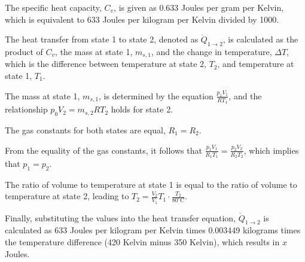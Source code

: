 The specific heat capacity, \( C_v \), is given as 0.633 Joules per gram per Kelvin, which is equivalent to 633 Joules per kilogram per Kelvin divided by 1000.

The heat transfer from state 1 to state 2, denoted as \( \dot{Q}_{1 \rightarrow 2} \), is calculated as the product of \( C_v \), the mass at state 1, \( m_{s,1} \), and the change in temperature, \( \Delta T \), which is the difference between temperature at state 2, \( T_2 \), and temperature at state 1, \( T_1 \).

The mass at state 1, \( m_{s,1} \), is determined by the equation \( \frac{p_1 V_1}{R T_1} \), and the relationship \( p_0 V_2 = m_{s,2} R T_2 \) holds for state 2.

The gas constants for both states are equal, \( R_1 = R_2 \).

From the equality of the gas constants, it follows that \( \frac{p_1 V_1}{R_1 T_1} = \frac{p_2 V_2}{R_2 T_2} \), which implies that \( p_1 = p_2 \).

The ratio of volume to temperature at state 1 is equal to the ratio of volume to temperature at state 2, leading to \( T_2 = \frac{V_2}{V_1} T_1 \cdot \frac{T_2}{80^\circ \text{C}} \).

Finally, substituting the values into the heat transfer equation, \( \dot{Q}_{1 \rightarrow 2} \) is calculated as 633 Joules per kilogram per Kelvin times 0.003449 kilograms times the temperature difference (420 Kelvin minus 350 Kelvin), which results in \( x \) Joules.